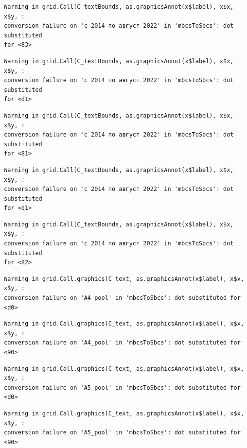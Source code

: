 \documentclass[
  letterpaper,
  DIV=11,
  numbers=noendperiod]{scrartcl}
\begin{document}
\begin{verbatim}
Warning in grid.Call(C_textBounds, as.graphicsAnnot(x$label), x$x, x$y, :
conversion failure on 'с 2014 по август 2022' in 'mbcsToSbcs': dot substituted
for <83>
\end{verbatim}

\begin{verbatim}
Warning in grid.Call(C_textBounds, as.graphicsAnnot(x$label), x$x, x$y, :
conversion failure on 'с 2014 по август 2022' in 'mbcsToSbcs': dot substituted
for <d1>
\end{verbatim}

\begin{verbatim}
Warning in grid.Call(C_textBounds, as.graphicsAnnot(x$label), x$x, x$y, :
conversion failure on 'с 2014 по август 2022' in 'mbcsToSbcs': dot substituted
for <81>
\end{verbatim}

\begin{verbatim}
Warning in grid.Call(C_textBounds, as.graphicsAnnot(x$label), x$x, x$y, :
conversion failure on 'с 2014 по август 2022' in 'mbcsToSbcs': dot substituted
for <d1>
\end{verbatim}

\begin{verbatim}
Warning in grid.Call(C_textBounds, as.graphicsAnnot(x$label), x$x, x$y, :
conversion failure on 'с 2014 по август 2022' in 'mbcsToSbcs': dot substituted
for <82>
\end{verbatim}

\begin{verbatim}
Warning in grid.Call.graphics(C_text, as.graphicsAnnot(x$label), x$x, x$y, :
conversion failure on 'А4_pool' in 'mbcsToSbcs': dot substituted for <d0>
\end{verbatim}

\begin{verbatim}
Warning in grid.Call.graphics(C_text, as.graphicsAnnot(x$label), x$x, x$y, :
conversion failure on 'А4_pool' in 'mbcsToSbcs': dot substituted for <90>
\end{verbatim}

\begin{verbatim}
Warning in grid.Call.graphics(C_text, as.graphicsAnnot(x$label), x$x, x$y, :
conversion failure on 'А5_pool' in 'mbcsToSbcs': dot substituted for <d0>
\end{verbatim}

\begin{verbatim}
Warning in grid.Call.graphics(C_text, as.graphicsAnnot(x$label), x$x, x$y, :
conversion failure on 'А5_pool' in 'mbcsToSbcs': dot substituted for <90>
\end{verbatim}
\end{document}
